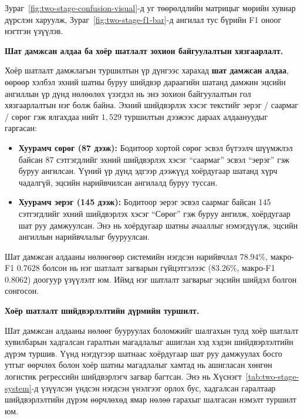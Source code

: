 Зураг~\ref{fig:two-stage-confusion-visual}-д уг төөрөлдлийн матрицыг мөрийн
хувиар дүрслэн харуулж, Зураг~\ref{fig:two-stage-f1-bar}-д ангилал тус бүрийн
F1 оноог нэгтгэн үзүүлэв.

\medskip
\noindent\textbf{Шат дамжсан алдаа ба хоёр шатлалт зохион байгуулалтын хязгаарлалт.}\par

Хоёр шатлалт дамжлагын туршилтын үр дүнгээс харахад \textbf{шат дамжсан алдаа},
өөрөөр хэлбэл эхний шатны буруу шийдвэр дараагийн шатанд дамжин эцсийн ангиллын
үр дүнд нөлөөлөх үзэгдэл нь энэ зохион байгуулалтын гол хязгаарлалтын нэг болж
байна. Эхний шийдвэрлэх хэсэг текстийг эерэг / саармаг / сөрөг гэж ялгахдаа
нийт $1{,}529$ туршилтын дээжээс дараах алдаануудыг гаргасан:

\begin{itemize}
    \item \textbf{Хуурамч сөрөг (87 дээж):} Бодитоор хортой сөрөг эсвэл бүтээлч шүүмжлэл
    байсан 87 сэтгэгдлийг эхний шийдвэрлэх хэсэг ``саармаг'' эсвэл ``эерэг'' гэж
    буруу ангилсан. Үүний үр дүнд эдгээр дээжүүд хоёрдугаар шатанд хүрч чадалгүй,
    эцсийн нарийвчилсан ангилалд буруу туссан.
    \item \textbf{Хуурамч эерэг (145 дээж):} Бодитоор эерэг эсвэл саармаг
    байсан 145 сэтгэгдлийг эхний шийдвэрлэх хэсэг ``Сөрөг'' гэж буруу ангилж,
    хоёрдугаар шат руу дамжуулсан. Энэ нь хоёрдугаар шатны ачааллыг нэмэгдүүлж, эцсийн
    ангиллын нарийвчлалыг бууруулсан.
\end{itemize}

Шат дамжсан алдааны нөлөөгөөр системийн нэгдсэн нарийвчлал $78.94\%$, макро-F1
$0.7628$ болсон нь нэг шатлалт загварын гүйцэтгэлээс ($83.26\%$, макро-F1
$0.8062$) доогуур үзүүлэлт юм. Иймд нэг шатлалт загварыг эцсийн шийдэл болгон
сонгосон.

\medskip
\noindent\textbf{Хоёр шатлалт шийдвэрлэлтийн дүрмийн туршилт.}\par

Шат дамжсан алдааны нөлөөг бууруулах боломжийг шалгахын тулд хоёр шатлалт
хувилбарын хадгалсан гаралтын магадлалыг ашиглан хэд хэдэн шийдвэрлэлтийн дүрэм
туршив. Үүнд нэгдүгээр шатнаас хоёрдугаар шат руу дамжуулах босго утгыг өөрчлөх
болон хоёр шатны магадлалыг хамтад нь ашигласан хөнгөн логистик регрессийн
шийдвэрлэгч загвар багтсан. Энэ нь Хүснэгт~\ref{tab:two-stage-system}-д үзүүлсэн үндсэн
нэгдсэн үнэлгээг орлох бус, хадгалсан гаралтаар шийдвэрлэлтийн дүрэм өөрчлөхөд
ямар нөлөө гарахыг шалгасан нэмэлт туршилт юм.

